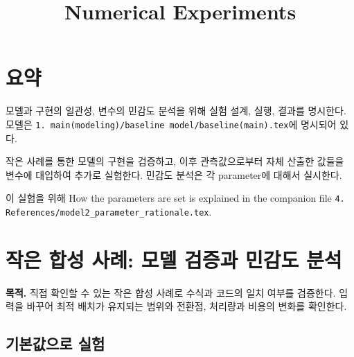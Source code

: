 \documentclass[10pt,a4paper]{article}
\title{Numerical Experiments}
\author{}
\date{}
\begin{document}
\maketitle

\begingroup\sloppy
\section{요약}

모델과 구현의 일관성, 변수의 민감도 분석을 위해 실험 설계, 실행, 결과를 명시한다. 모델은 \texttt{1. main(modeling)/baseline model/baseline(main).tex}에 명시되어 있다.

작은 사례를 통한 모델의 구현을 검증하고, 이후 관측값으로부터 자체 산출한 값들을 변수에 대입하여 추가로 실험한다. 민감도 분석은 각 parameter에 대해서 실시한다.

이 실험을 위해 How the parameters are set is explained in the companion file
\texttt{4. References/model2\_parameter\_rationale.tex}.
\par\endgroup

\section{작은 합성 사례: 모델 검증과 민감도 분석}
\label{sec:smallcase}
\textbf{목적.} 직접 확인할 수 있는 작은 합성 사례로 수식과 코드의 일치 여부를 검증한다.
입력을 바꾸어 최적 배치가 유지되는 범위와 전환점, 처리량과 비용의 변화를 확인한다.

\subsection{기본값으로 실험}
\end{document}

